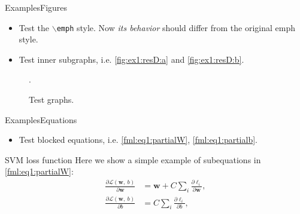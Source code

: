 \documentclass[10pt,xcolor={dvipsnames},aspectratio=169]{beamer}
\begin{document}
\begin{frame}{Examples}{Figures}
\begin{itemize}
  \item Test the \texttt{$\backslash$emph} style. Now \emph{its behavior} should differ from the original emph style.
  \item Test inner subgraphs, i.e. \cref{fig:ex1:resD:a} and \cref{fig:ex1:resD:b}.
\end{itemize}

\begin{figure}[htbp]
  \centering
  \DeclareGraphicsExtensions.
  \caption{Test graphs.}\label{fig:ex1:resD}
\end{figure}
\end{frame}


\begin{frame}{Examples}{Equations}
\begin{itemize}
  \item Test blocked equations, i.e. \eqref{fml:eq1:partialW}, \eqref{fml:eq1:partialb}.
\end{itemize}

\begin{block}{SVM loss function}
  \label{blc:eq1} Here we show a simple example of subequations in \eqref{fml:eq1:partialW}:
  \begin{subequations}
    \renewcommand{\theequation}
    {\theparentequation-\arabic{equation}}
    \begin{align}
      \frac{\partial \mathcal{L}(\mathbf{w},~b)}{\partial \mathbf{w}} &= \mathbf{w} + C \sum\limits_i\frac{\partial \ell_i}{\partial \mathbf{w}}, \label{fml:eq1:partialW}\\
      \frac{\partial \mathcal{L}(\mathbf{w},~b)}{\partial b} &= C \sum\limits_i\frac{\partial \ell_i}{\partial b}, \label{fml:eq1:partialb}
    \end{align}
  \end{subequations}
\end{block}
\end{frame}
\end{document}
